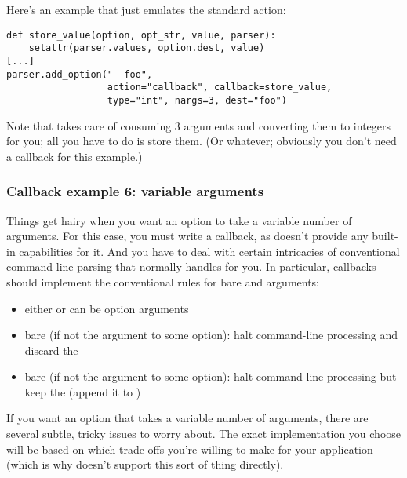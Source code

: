 Here's an example that just emulates the standard  action:
\begin{verbatim}
def store_value(option, opt_str, value, parser):
    setattr(parser.values, option.dest, value)
[...]
parser.add_option("--foo",
                  action="callback", callback=store_value,
                  type="int", nargs=3, dest="foo")
\end{verbatim}

Note that  takes care of consuming 3 arguments and converting them
to integers for you; all you have to do is store them.  (Or whatever;
obviously you don't need a callback for this example.)


\subsubsection{Callback example 6: variable arguments\label{optparse-callback-example-6}}

Things get hairy when you want an option to take a variable number of
arguments.  For this case, you must write a callback, as  doesn't
provide any built-in capabilities for it.  And you have to deal with
certain intricacies of conventional \UNIX{} command-line parsing that 
normally handles for you.  In particular, callbacks should implement
the conventional rules for bare  and  arguments:
\begin{itemize}
\item {} 
either  or  can be option arguments

\item {} 
bare  (if not the argument to some option): halt command-line
processing and discard the 

\item {} 
bare  (if not the argument to some option): halt command-line
processing but keep the  (append it to )

\end{itemize}

If you want an option that takes a variable number of arguments, there
are several subtle, tricky issues to worry about.  The exact
implementation you choose will be based on which trade-offs you're
willing to make for your application (which is why  doesn't support
this sort of thing directly).

